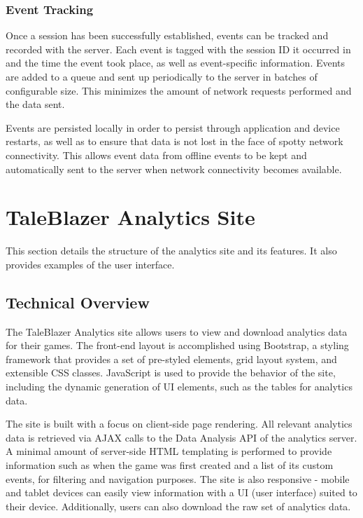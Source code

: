 \subsubsection{Event Tracking}

Once a session has been successfully established, events can be tracked and recorded with the server. Each event is tagged with the session ID it occurred in and the time the event took place, as well as event-specific information. Events are added to a queue and sent up periodically to the server in batches of configurable size. This minimizes the amount of network requests performed and the data sent.

Events are persisted locally in order to persist through application and device restarts, as well as to ensure that data is not lost in the face of spotty network connectivity. This allows event data from offline events to be kept and automatically sent to the server when network connectivity becomes available.
\pagebreak

\section{TaleBlazer Analytics Site}

This section details the structure of the analytics site and its features. It also provides examples of the user interface. 

\subsection{Technical Overview}

The TaleBlazer Analytics site allows users to view and download analytics data for their games. The front-end layout is accomplished using Bootstrap, a styling framework that provides a set of pre-styled elements, grid layout system, and extensible CSS classes. JavaScript is used to provide the behavior of the site, including the dynamic generation of UI elements, such as the tables for analytics data. 

The site is built with a focus on client-side page rendering. All relevant analytics data is retrieved via AJAX calls to the Data Analysis API of the analytics server. A minimal amount of server-side HTML templating is performed to provide information such as when the game was first created and a list of its custom events, for filtering and navigation purposes. The site is also responsive - mobile and tablet devices can easily view information with a UI (user interface) suited to their device. Additionally, users can also download the raw set of analytics data.


